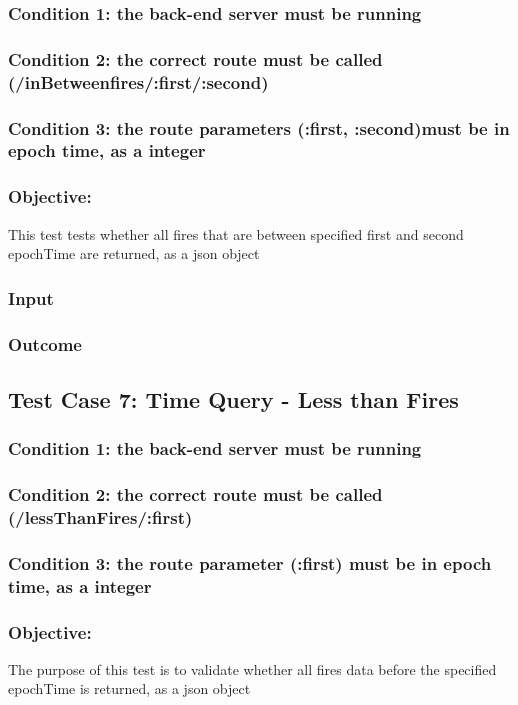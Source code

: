 \subsubsection{Condition 1: the back-end server must be running}
\subsubsection{Condition 2: the correct route must be called (/inBetweenfires/:first/:second)}
\subsubsection{Condition 3: the route parameters (:first, :second)must be in epoch time, as a integer}
\subsubsection{Objective: } This test tests whether all fires that are between specified first and second epochTime are returned, as a json object
\subsubsection{Input}
\subsubsection{Outcome}


\subsection{Test Case 7: Time Query - Less than Fires}
\subsubsection{Condition 1: the back-end server must be running}
\subsubsection{Condition 2: the correct route must be called (/lessThanFires/:first)}
\subsubsection{Condition 3: the route parameter (:first) must be in epoch time, as a integer}
\subsubsection{Objective:} The purpose of this test is to validate whether all  fires data before the specified epochTime is returned, as a json object
